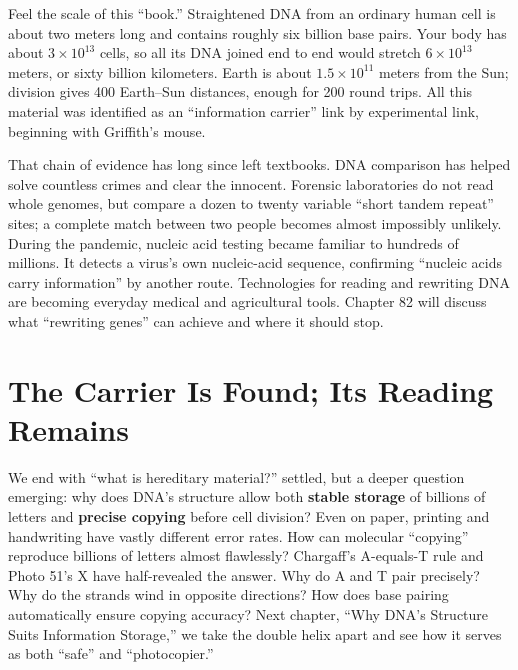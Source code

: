 Feel the scale of this ``book.'' Straightened DNA from an ordinary human cell is about two meters long and contains roughly six billion base pairs. Your body has about $3\times 10^{13}$ cells, so all its DNA joined end to end would stretch $6\times 10^{13}$ meters, or sixty billion kilometers. Earth is about $1.5\times 10^{11}$ meters from the Sun; division gives 400 Earth--Sun distances, enough for 200 round trips. All this material was identified as an ``information carrier'' link by experimental link, beginning with Griffith's mouse.

That chain of evidence has long since left textbooks. DNA comparison has helped solve countless crimes and clear the innocent. Forensic laboratories do not read whole genomes, but compare a dozen to twenty variable ``short tandem repeat'' sites; a complete match between two people becomes almost impossibly unlikely. During the pandemic, nucleic acid testing became familiar to hundreds of millions. It detects a virus's own nucleic-acid sequence, confirming ``nucleic acids carry information'' by another route. Technologies for reading and rewriting DNA are becoming everyday medical and agricultural tools. Chapter 82 will discuss what ``rewriting genes'' can achieve and where it should stop.

\section{The Carrier Is Found; Its Reading Remains}

We end with ``what is hereditary material?'' settled, but a deeper question emerging: why does DNA's structure allow both \textbf{stable storage} of billions of letters and \textbf{precise copying} before cell division? Even on paper, printing and handwriting have vastly different error rates. How can molecular ``copying'' reproduce billions of letters almost flawlessly? Chargaff's A-equals-T rule and Photo 51's X have half-revealed the answer. Why do A and T pair precisely? Why do the strands wind in opposite directions? How does base pairing automatically ensure copying accuracy? Next chapter, ``Why DNA's Structure Suits Information Storage,'' we take the double helix apart and see how it serves as both ``safe'' and ``photocopier.''

